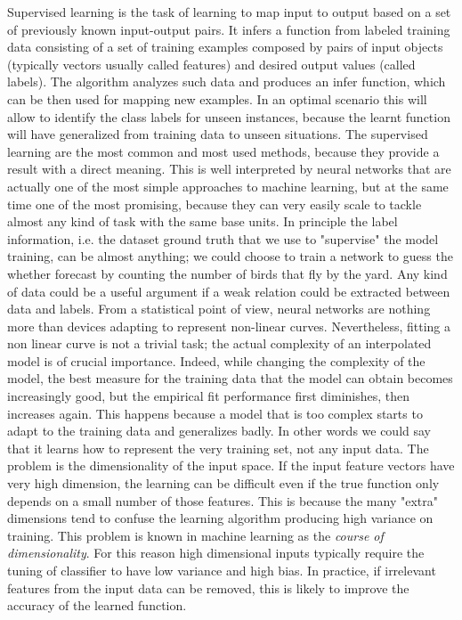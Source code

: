 Supervised learning is the task of learning to map input to output based on a set of previously known input-output pairs. It infers a function from labeled training data consisting of a set of training examples composed by pairs of input objects (typically vectors usually called features) and desired output values (called labels). The algorithm analyzes such data and produces an infer function, which can be then used for mapping new examples. In an optimal scenario this will allow to identify the class labels for unseen instances, because the learnt function will have generalized from training data to unseen situations.
The supervised learning are the most common and most used methods, because they provide a result with a direct meaning. 
This is well interpreted by neural networks that are actually one of the most simple approaches to machine learning, but at the same time one of the most promising, because they can very easily scale to tackle almost any kind of task with the same base units.
%
In principle the label information, i.e. the dataset ground truth that we use to "supervise" the model training, can be almost anything; we could choose to train a network to guess the whether forecast by counting the number of birds that fly by the yard. Any kind of data could be a useful argument if a weak relation could be extracted between data and labels.
From a statistical point of view, neural networks are nothing more than devices adapting to represent non-linear curves. 
Nevertheless, fitting a non linear curve is not a trivial task; the actual complexity of an interpolated model is of crucial importance. 
Indeed, while changing the complexity of the model, the best measure for the training data that the model can obtain becomes increasingly good, but the empirical fit performance first diminishes, then increases again. This happens because a model that is too complex starts to adapt to the training data and generalizes badly. In other words we could say that it learns how to represent the very training set, not any input data.
%
The problem is the dimensionality of the input space. If the input feature vectors have very high dimension, the learning can be difficult even if the true function only depends on a small number of those features.  This is because the many "extra" dimensions tend to confuse the learning algorithm producing high variance on training. 
This problem is known in machine learning as the \textit{course of dimensionality}.
For this reason high dimensional inputs typically require the tuning of classifier to have low variance and high bias. In practice, if irrelevant features from the input data can be removed, this is likely to improve the accuracy of the learned function. 

